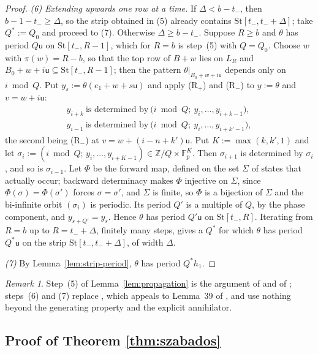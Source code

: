 \documentclass[11pt,reqno]{amsart}
\theoremstyle{plain}
\theoremstyle{definition}
\theoremstyle{remark}
\newtheorem{rem}[thm]{Remark}
\theoremstyle{plain}
\theoremstyle{remark}
\theoremstyle{definition}
\numberwithin{equation}{section}
\newcommand{\Z}{\mathbb{Z}}
\newcommand{\Fp}{\mathbb{F}_p}
\newcommand{\su}{\mathsf{u}}
\begin{document}
\begin{proof}
\emph{(6) Extending upwards one row at a time.}  If $\Delta<b-t_-$, then
$b-1-t_-\ge\Delta$, so the strip obtained in (5) already contains
$\mathrm{St}[t_-,t_-+\Delta]$; take $Q^*:=Q_0$ and proceed to (7).
Otherwise $\Delta\ge b-t_-$.  Suppose $R\ge b$ and $\theta$
has period $Q\su$ on $\mathrm{St}[t_-,R-1]$, which for $R=b$ is step~(5) with
$Q=Q_0$.  Choose $w$ with $\pi(w)=R-b$, so that the top row of $B+w$ lies on
$L_R$ and $B_0+w+i\su\subseteq\mathrm{St}[t_-,R-1]$; then the pattern
$\theta|_{B_0+w+i\su}$ depends only on $i\bmod Q$.  Put
$y_s:=\theta(e_1+w+s\su)$ and apply \textup{(R$_+$)} and \textup{(R$_-$)} to
$y:=\theta$ and $v=w+i\su$:
\begin{gather*}
y_{i+k}\ \text{is determined by}\ \bigl(i\bmod Q;\ y_i,\dots,y_{i+k-1}\bigr),\\
y_{i-1}\ \text{is determined by}\ \bigl(i\bmod Q;\ y_i,\dots,y_{i+k'-1}\bigr),
\end{gather*}
the second being \textup{(R$_-$)} at $v=w+(i-n+k')\su$.  Put
$K:=\max(k,k',1)$ and let
$\sigma_i:=(i\bmod Q;\,y_i,\dots,y_{i+K-1})\in\Z/Q\times\Fp^{K}$.  Then
$\sigma_{i+1}$ is determined by $\sigma_i$, and so is $\sigma_{i-1}$.  Let
$\Phi$ be the forward map, defined on the set $\Sigma$ of states that actually
occur; backward determinacy makes $\Phi$ injective on $\Sigma$, since
$\Phi(\sigma)=\Phi(\sigma')$ forces $\sigma=\sigma'$, and $\Sigma$ is finite, so
$\Phi$ is a bijection of $\Sigma$ and the bi-infinite orbit $(\sigma_i)$ is
periodic.  Its period $Q'$ is a multiple of $Q$, by the phase component, and
$y_{s+Q'}=y_s$.  Hence $\theta$ has period $Q'\su$ on $\mathrm{St}[t_-,R]$.
Iterating from $R=b$ up to $R=t_-+\Delta$, finitely many steps, gives a $Q^*$
for which $\theta$ has period $Q^*\su$ on the strip
$\mathrm{St}[t_-,t_-+\Delta]$, of width $\Delta$.

\emph{(7)}  By Lemma~\ref{lem:strip-period}, $\theta$ has period $Q^*h_1$.
\end{proof}

\begin{rem}\label{rem:szab-steps}
Step~(5) of Lemma~\ref{lem:propagation} is the argument of \cite[Lemma~4]{Sz}
and of \cite[Lemma~2.24]{CyrKra15}; steps~(6) and (7) replace \cite[Lemma~3]{Sz},
which appeals to Lemma~39 of \cite{KS}, and use nothing beyond the generating
property and the explicit annihilator.
\end{rem}

\subsection{Proof of Theorem \texorpdfstring{\ref{thm:szabados}}{D.1}}
\label{app:szab-proof}
\end{document}
